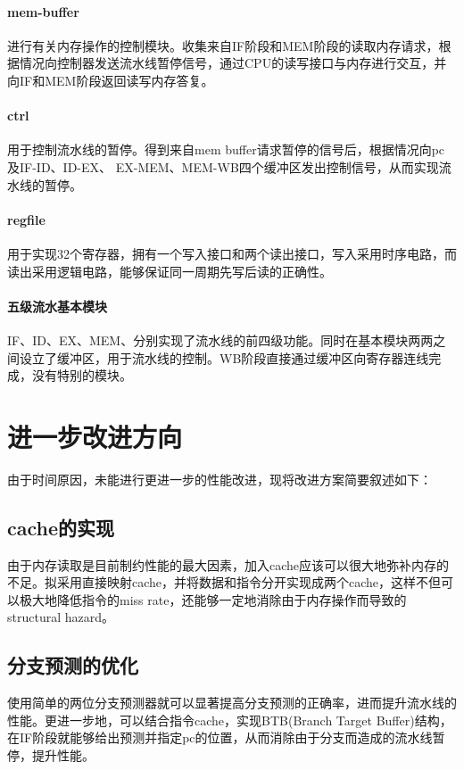\documentclass{article}
\begin{document}
\paragraph{mem-buffer}进行有关内存操作的控制模块。收集来自IF阶段和MEM阶段的读取内存请求，根据情况向控制器发送流水线暂停信号，通过CPU的读写接口与内存进行交互，并向IF和MEM阶段返回读写内存答复。
\paragraph{ctrl}用于控制流水线的暂停。得到来自mem buffer请求暂停的信号后，根据情况向pc及IF-ID、ID-EX、 EX-MEM、MEM-WB四个缓冲区发出控制信号，从而实现流水线的暂停。
\paragraph{regfile}用于实现32个寄存器，拥有一个写入接口和两个读出接口，写入采用时序电路，而读出采用逻辑电路，能够保证同一周期先写后读的正确性。
\paragraph{五级流水基本模块}IF、ID、EX、MEM、分别实现了流水线的前四级功能。同时在基本模块两两之间设立了缓冲区，用于流水线的控制。WB阶段直接通过缓冲区向寄存器连线完成，没有特别的模块。
\section{进一步改进方向}
由于时间原因，未能进行更进一步的性能改进，现将改进方案简要叙述如下：
\subsection{cache的实现}
由于内存读取是目前制约性能的最大因素，加入cache应该可以很大地弥补内存的不足。拟采用直接映射cache，并将数据和指令分开实现成两个cache，这样不但可以极大地降低指令的miss rate，还能够一定地消除由于内存操作而导致的structural hazard。
\subsection{分支预测的优化}
使用简单的两位分支预测器就可以显著提高分支预测的正确率，进而提升流水线的性能。更进一步地，可以结合指令cache，实现BTB(Branch Target Buffer)结构，在IF阶段就能够给出预测并指定pc的位置，从而消除由于分支而造成的流水线暂停，提升性能。
\end{document}
